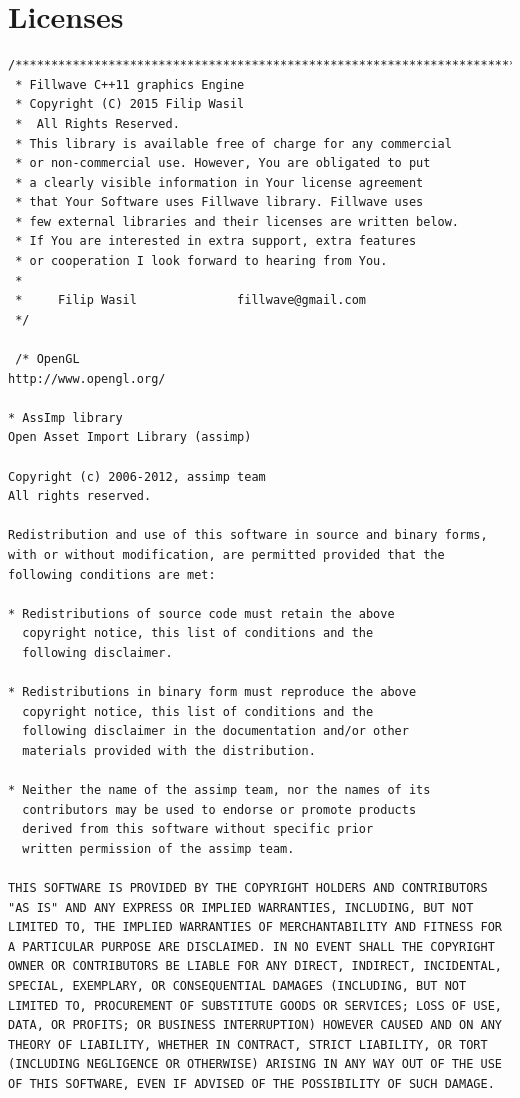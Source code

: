 \documentclass{article}
\begin{document}
\section{Licenses}\label{sec:Licenses}
\begin{lstlisting}
/*************************************************************************
 * Fillwave C++11 graphics Engine
 * Copyright (C) 2015 Filip Wasil
 *  All Rights Reserved.
 * This library is available free of charge for any commercial
 * or non-commercial use. However, You are obligated to put
 * a clearly visible information in Your license agreement
 * that Your Software uses Fillwave library. Fillwave uses
 * few external libraries and their licenses are written below.
 * If You are interested in extra support, extra features
 * or cooperation I look forward to hearing from You.
 *
 *     Filip Wasil              fillwave@gmail.com
 */
 
 /* OpenGL
http://www.opengl.org/

* AssImp library
Open Asset Import Library (assimp)

Copyright (c) 2006-2012, assimp team
All rights reserved.

Redistribution and use of this software in source and binary forms, 
with or without modification, are permitted provided that the 
following conditions are met:

* Redistributions of source code must retain the above
  copyright notice, this list of conditions and the
  following disclaimer.

* Redistributions in binary form must reproduce the above
  copyright notice, this list of conditions and the
  following disclaimer in the documentation and/or other
  materials provided with the distribution.

* Neither the name of the assimp team, nor the names of its
  contributors may be used to endorse or promote products
  derived from this software without specific prior
  written permission of the assimp team.

THIS SOFTWARE IS PROVIDED BY THE COPYRIGHT HOLDERS AND CONTRIBUTORS 
"AS IS" AND ANY EXPRESS OR IMPLIED WARRANTIES, INCLUDING, BUT NOT 
LIMITED TO, THE IMPLIED WARRANTIES OF MERCHANTABILITY AND FITNESS FOR
A PARTICULAR PURPOSE ARE DISCLAIMED. IN NO EVENT SHALL THE COPYRIGHT 
OWNER OR CONTRIBUTORS BE LIABLE FOR ANY DIRECT, INDIRECT, INCIDENTAL,
SPECIAL, EXEMPLARY, OR CONSEQUENTIAL DAMAGES (INCLUDING, BUT NOT 
LIMITED TO, PROCUREMENT OF SUBSTITUTE GOODS OR SERVICES; LOSS OF USE,
DATA, OR PROFITS; OR BUSINESS INTERRUPTION) HOWEVER CAUSED AND ON ANY 
THEORY OF LIABILITY, WHETHER IN CONTRACT, STRICT LIABILITY, OR TORT 
(INCLUDING NEGLIGENCE OR OTHERWISE) ARISING IN ANY WAY OUT OF THE USE 
OF THIS SOFTWARE, EVEN IF ADVISED OF THE POSSIBILITY OF SUCH DAMAGE.




\end{lstlisting}
\end{document}
